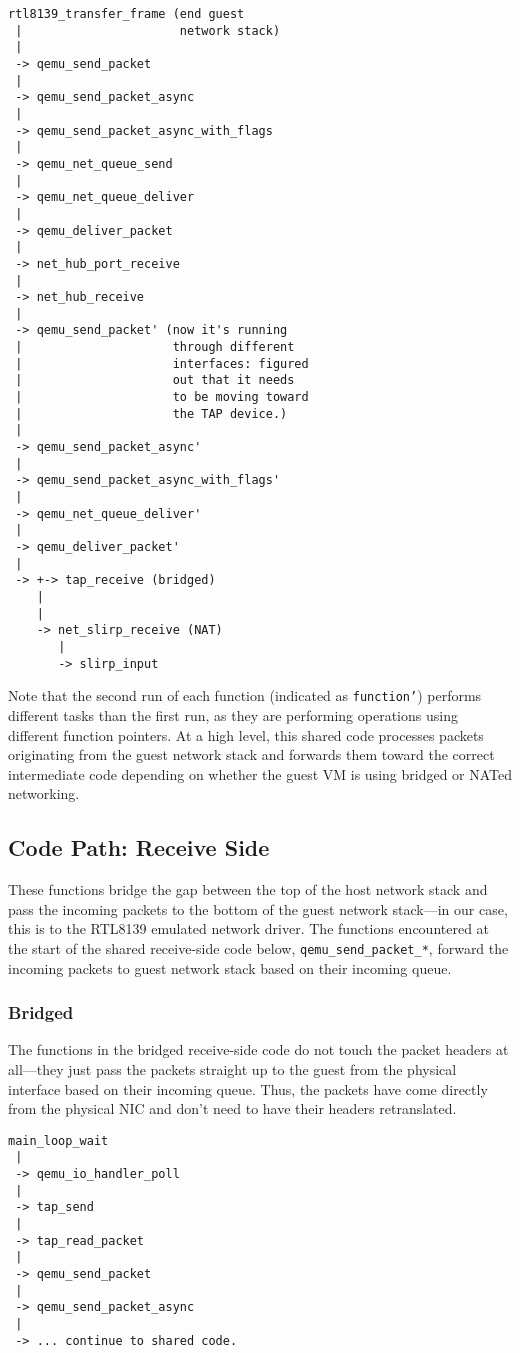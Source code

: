 \documentclass[letterpaper,twocolumn,11pt]{article}
\begin{document}
\begin{verbatim}
rtl8139_transfer_frame (end guest 
 |                      network stack)
 |
 -> qemu_send_packet
 |
 -> qemu_send_packet_async
 |
 -> qemu_send_packet_async_with_flags
 |
 -> qemu_net_queue_send
 |
 -> qemu_net_queue_deliver
 |
 -> qemu_deliver_packet
 |
 -> net_hub_port_receive
 |
 -> net_hub_receive
 |
 -> qemu_send_packet' (now it's running 
 |                     through different 
 |                     interfaces: figured 
 |                     out that it needs  
 |                     to be moving toward 
 |                     the TAP device.)
 |
 -> qemu_send_packet_async'
 |
 -> qemu_send_packet_async_with_flags'
 |
 -> qemu_net_queue_deliver'
 |
 -> qemu_deliver_packet'
 |
 -> +-> tap_receive (bridged)
    |
    |
    -> net_slirp_receive (NAT)
       |
       -> slirp_input 
\end{verbatim}

Note that the second run of each function (indicated as \texttt{function'}) performs different tasks than the first run, as they are performing operations using different function pointers. At a high level, this shared code processes packets originating from the guest network stack and forwards them toward the correct intermediate code depending on whether the guest VM is using bridged or NATed networking.

\subsection*{Code Path: Receive Side}
These functions bridge the gap between the top of the host network stack and pass the incoming packets to the bottom of the guest network stack---in our case, this is to the RTL8139 emulated network driver. The functions encountered at the start of the shared receive-side code below, \texttt{qemu\_send\_packet\_*}, forward the incoming packets to guest network stack based on their incoming queue.

\subsubsection*{Bridged}
The functions in the bridged receive-side code do not touch the packet headers at all---they just pass the packets straight up to the guest from the physical interface based on their incoming queue. Thus, the packets have come directly from the physical NIC and don't need to have their headers retranslated.

\begin{verbatim}
main_loop_wait
 |
 -> qemu_io_handler_poll
 |
 -> tap_send
 |
 -> tap_read_packet
 |
 -> qemu_send_packet
 |
 -> qemu_send_packet_async
 |
 -> ... continue to shared code. 
\end{verbatim}
\end{document}
